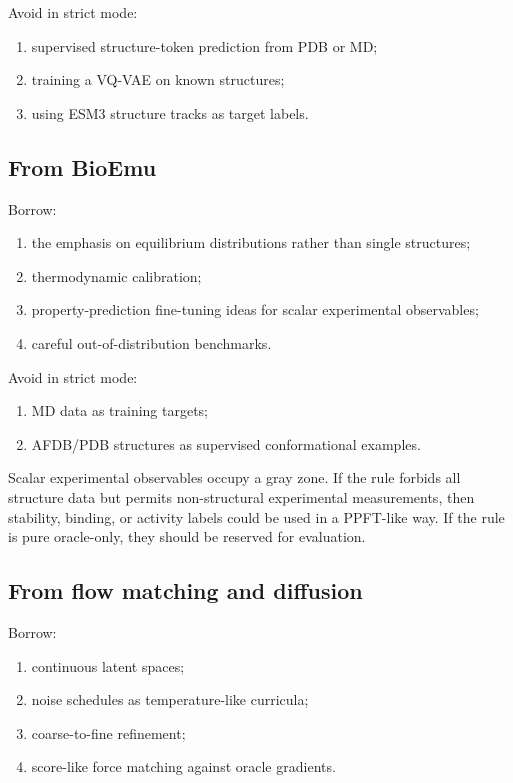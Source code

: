 \documentclass[11pt]{article}
\begin{document}
Avoid in strict mode:
\begin{enumerate}[leftmargin=2em]
  \item supervised structure-token prediction from PDB or MD;
  \item training a VQ-VAE on known structures;
  \item using ESM3 structure tracks as target labels.
\end{enumerate}

\subsection{From BioEmu}

Borrow:
\begin{enumerate}[leftmargin=2em]
  \item the emphasis on equilibrium distributions rather than single structures;
  \item thermodynamic calibration;
  \item property-prediction fine-tuning ideas for scalar experimental observables;
  \item careful out-of-distribution benchmarks.
\end{enumerate}

Avoid in strict mode:
\begin{enumerate}[leftmargin=2em]
  \item MD data as training targets;
  \item AFDB/PDB structures as supervised conformational examples.
\end{enumerate}

Scalar experimental observables occupy a gray zone. If the rule forbids all structure data but permits non-structural experimental measurements, then stability, binding, or activity labels could be used in a PPFT-like way. If the rule is pure oracle-only, they should be reserved for evaluation.

\subsection{From flow matching and diffusion}

Borrow:
\begin{enumerate}[leftmargin=2em]
  \item continuous latent spaces;
  \item noise schedules as temperature-like curricula;
  \item coarse-to-fine refinement;
  \item score-like force matching against oracle gradients.
\end{enumerate}
\end{document}
